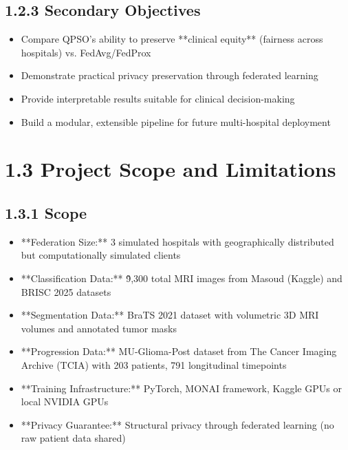 \subsection{1.2.3 Secondary Objectives}
\begin{itemize}
  \item Compare QPSO's ability to preserve **clinical equity** (fairness across hospitals) vs. FedAvg/FedProx
  \item Demonstrate practical privacy preservation through federated learning
  \item Provide interpretable results suitable for clinical decision-making
  \item Build a modular, extensible pipeline for future multi-hospital deployment
\end{itemize}


\section{1.3 Project Scope and Limitations}

\subsection{1.3.1 Scope}
\begin{itemize}
  \item **Federation Size:** 3 simulated hospitals with geographically distributed but computationally simulated clients
  \item **Classification Data:** \~9,300 total MRI images from Masoud (Kaggle) and BRISC 2025 datasets
  \item **Segmentation Data:** BraTS 2021 dataset with volumetric 3D MRI volumes and annotated tumor masks
  \item **Progression Data:** MU-Glioma-Post dataset from The Cancer Imaging Archive (TCIA) with 203 patients, 791 longitudinal timepoints
  \item **Training Infrastructure:** PyTorch, MONAI framework, Kaggle GPUs or local NVIDIA GPUs
  \item **Privacy Guarantee:** Structural privacy through federated learning (no raw patient data shared)
\end{itemize}


